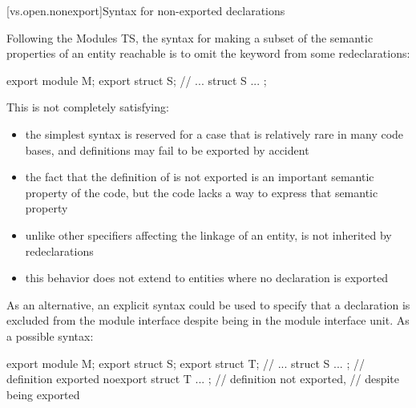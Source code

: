 [vs.open.nonexport]{Syntax for non-exported declarations}

\pnum
Following the Modules TS,
the syntax for making a subset
of the semantic properties of an entity reachable
is to omit the  keyword
from some redeclarations:

\begin{codeblock}
export module M;
export struct S;
// ...
struct S { ... };
\end{codeblock}

\pnum
This is not completely satisfying:
\begin{itemize}
\item the simplest syntax is reserved for a case that is
relatively rare in many code bases, and definitions may
fail to be exported by accident
\item the fact that the definition of  is not exported
is an important semantic property of the code,
but the code lacks a way to express that semantic property
\item unlike other specifiers affecting the linkage
of an entity,  is not inherited by redeclarations
\item this behavior does not extend to entities where
no declaration is exported
\end{itemize}

As an alternative, an explicit syntax could be used
to specify that a declaration is excluded from the module interface
despite being in the module interface unit.
As a possible syntax:

\begin{codeblock}
export module M;
export struct S;
export struct T;
// ...
struct S { ... };                    // definition exported
noexport struct T { ... };           // definition not exported,
                                     // despite  being exported
\end{codeblock}
